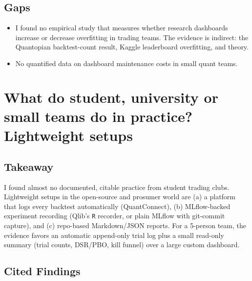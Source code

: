 \documentclass{article}
\begin{document}
\subsection{Gaps}

\begin{itemize}

\item I found no empirical study that measures whether research dashboards increase or decrease overfitting in trading teams. The evidence is indirect: the Quantopian backtest-count result, Kaggle leaderboard overfitting, and theory.

\item No quantified data on dashboard maintenance costs in small quant teams.

\end{itemize}

\section{What do student, university or small teams do in practice? Lightweight setups}

\subsection{Takeaway}

I found almost no documented, citable practice from student trading clubs. Lightweight setups in the open-source and prosumer world are (a) a platform that logs every backtest automatically (QuantConnect), (b) MLflow-backed experiment recording (Qlib's \texttt{R} recorder, or plain MLflow with git-commit capture), and (c) repo-based Markdown/\allowbreak{}JSON reports. For a 5-person team, the evidence favors an automatic append-only trial log plus a small read-only summary (trial counts, DSR/\allowbreak{}PBO, kill funnel) over a large custom dashboard.

\subsection{Cited Findings}
\end{document}
